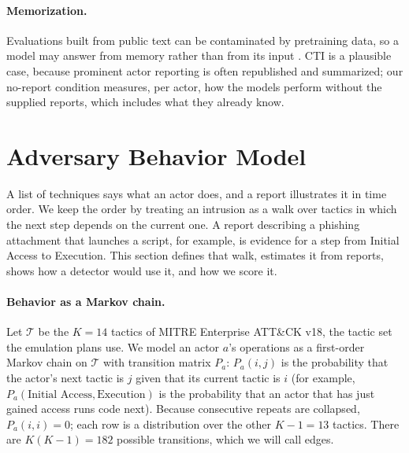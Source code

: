 \documentclass[letterpaper]{article}
\begin{document}
\paragraph{Memorization.} Evaluations built from public text can be contaminated by pretraining data, so a model may answer from memory rather than from its input \citep{sainz2023nlptrouble,golchin2024timetravel}. CTI is a plausible case, because prominent actor reporting is often republished and summarized; our no-report condition measures, per actor, how the models perform without the supplied reports, which includes what they already know.

\section{Adversary Behavior Model}
A list of techniques says what an actor does, and a report illustrates it in time order. We keep the order by treating an intrusion as a walk over tactics in which the next step depends on the current one. A report describing a phishing attachment that launches a script, for example, is evidence for a step from Initial Access to Execution. This section defines that walk, estimates it from reports, shows how a detector would use it, and how we score it.

\paragraph{Behavior as a Markov chain.} Let $\mathcal{T}$ be the $K=14$ tactics of MITRE Enterprise ATT\&CK v18, the tactic set the emulation plans use. We model an actor $a$'s operations as a first-order Markov chain on $\mathcal{T}$ with transition matrix $P_a$: $P_a(i,j)$ is the probability that the actor's next tactic is $j$ given that its current tactic is $i$ (for example, $P_a(\text{Initial Access}, \text{Execution})$ is the probability that an actor that has just gained access runs code next). Because consecutive repeats are collapsed, $P_a(i,i)=0$; each row is a distribution over the other $K-1=13$ tactics. There are $K(K-1)=182$ possible transitions, which we will call edges.
\end{document}
